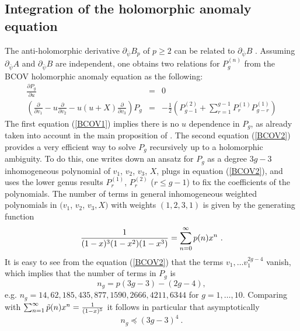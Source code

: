 \documentclass[12pt]{article}
\begin{document}
\subsection{Integration of the holomorphic anomaly equation}
\label{integration}
The anti-holomorphic derivative $\partial_{\bar{\psi}}B_p$ of
$p\geq 2$ can be related to $\partial_{\bar{\psi}}B$
\cite{Yamaguchi}. Assuming $\partial_{\bar{\psi}}A$ and
$\partial_{\bar{\psi}}B$ are independent, one obtains two
relations for $P^{(n)}_g$ from the BCOV holomorphic anomaly
equation as the following:
\begin{eqnarray}
\frac{\partial P_g}{\partial u}&=&0 \label{BCOV1} \\
(\frac{\partial}{\partial{v_1}}-u\frac{\partial }{\partial
{v_2}}-u(u+X)\frac{\partial}{\partial{v_3}})P_g&=&-\frac{1}{2}(P^{(2)}_{g-1}+\sum_{r=1}^{g-1}P^{(1)}_rP^{(1)}_{g-r})
\label{BCOV2}
\end{eqnarray}
The first equation (\ref{BCOV1}) implies there is no $u$
dependence in $P_g$, as already taken into account in the main
proposition of \cite{Yamaguchi}. The second equation (\ref{BCOV2})
provides a very efficient way to solve $P_g$ recursively up to a
holomorphic ambiguity. To do this, one writes down an ansatz for
$P_g$ as a degree $3g-3$ inhomogeneous polynomial of $v_1$, $v_2$,
$v_3$, $X$, plugs in equation (\ref{BCOV2}), and uses the lower
genus results $P_r^{(1)}$, $P^{(2)}_r$ ($r\leq g-1$) to fix the
coefficients of the polynomials. The number of terms in general
inhomogeneous weighted polynomials in $(v_1$, $v_2$, $v_3,X)$ with
weights $(1,2,3,1)$ is given by the generating function
\begin{equation}
{1\over {(1-x)^3 (1-x^2) (1-x^3)}}=\sum_{n=0}^\infty p(n) x^n\ .
\end{equation}
It is easy to see from the equation (\ref{BCOV2}) that the terms
$v_1,\ldots v_1^{2g-4}$ vanish, which implies that the number of
terms in  $P_g$ is
\begin{equation}
n_g= p(3 g-3)-(2 g-4),
\end{equation}
e.g. $n_g= 14, 62, 185, 435, 877, 1590, 2666, 4211, 6344$ for
$g=1,\ldots,10$. Comparing with $\sum_{n=1}^\infty \tilde p(n)
x^n={1\over (1-x)^5}$ it follows in particular that
asymptotically
\begin{equation}
n_g \preceq (3g-3)^4 \ . \label{growth}
\end{equation}
\end{document}
